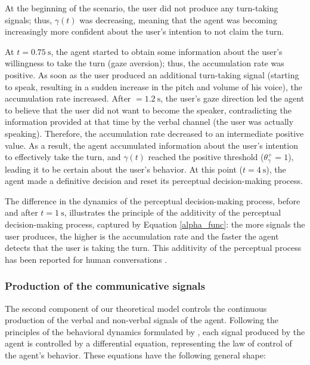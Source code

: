 \documentclass[twocolumn]{svjour3}
\begin{document}
At the beginning of the scenario, the user did not produce any turn-taking signals; thus, $\gamma(t)$ was decreasing, meaning that the agent was becoming increasingly more confident about the user's intention to not claim the turn. 

At $t=0.75~\text{s}$, the agent started to obtain some information about the user's willingness to take the turn (gaze aversion); thus, the accumulation rate was positive. 
As soon as the user produced an additional turn-taking signal (starting to speak, resulting in a sudden increase in the pitch and volume of his voice), the accumulation rate increased. 
After $=1.2~\text{s}$, the user's gaze direction led the agent to believe that the user did not want to become the speaker, contradicting the information provided at that time by the verbal channel (the user was actually speaking). Therefore, the accumulation rate decreased to an intermediate positive value. 
As a result, the agent accumulated information about the user's intention to effectively take the turn, and $\gamma(t)$ reached the positive threshold ($\theta_{\gamma}^{+}=1$), leading it to be certain about the user's behavior. At this point ($t=4~\text{s}$), the agent made a definitive decision and reset its perceptual decision-making process. 

The  difference in the dynamics of the perceptual decision-making process, before and after $t=1~\text{s}$, illustrates the principle of the additivity of the perceptual decision-making process, captured by Equation \ref{alpha_func}: the more signals the user produces,
 the higher is the accumulation rate and the faster the agent detects that the user is taking the turn. This additivity of the perceptual process has been reported for human conversations \citep{gravano_turn-taking_2011,hjalmarsson_additive_2011}. 

\subsubsection{Production of the communicative signals}

The second component of our theoretical model controls the continuous production of the verbal and non-verbal signals of the agent.
Following the principles of the behavioral dynamics formulated by \citep{warren_dynamics_2006}, each signal produced by the agent is controlled by a differential equation, representing the law of control of the agent's behavior. These equations have the following general shape: 
\end{document}
